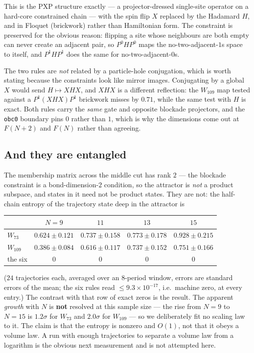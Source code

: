 \documentclass[11pt]{article}
\newcommand{\rt}[1]{\texttt{#1}}
\theoremstyle{plain}
\begin{document}
\noindent This is the PXP structure exactly --- a projector-dressed single-site
operator on a hard-core constrained chain --- with the spin flip $X$ replaced by
the Hadamard $H$, and in Floquet (brickwork) rather than Hamiltonian form. The
constraint is preserved for the obvious reason: flipping a site whose neighbours
are both empty can never create an adjacent pair, so $P^0HP^0$ maps the
no-two-adjacent-$1$s space to itself, and $P^1HP^1$ does the same for
no-two-adjacent-$0$s.

The two rules are \emph{not} related by a particle-hole conjugation, which is
worth stating because the constraints look like mirror images. Conjugating by a
global $X$ would send $H\mapsto XHX$, and $XHX$ is a different reflection: the
$W_{109}$ map tested against a $P^1(XHX)P^1$ brickwork misses by $0.71$, while
the same test with $H$ is exact. Both rules carry the \emph{same} gate and
opposite blockade projectors, and the \rt{obc0} boundary pins $0$ rather than
$1$, which is why the dimensions come out at $F(N+2)$ and $F(N)$ rather than
agreeing.

\subsection{And they are entangled}

The membership matrix across the middle cut has rank $2$ --- the blockade
constraint is a bond-dimension-$2$ condition, so the attractor is \emph{not} a
product subspace, and states in it need not be product states. They are not: the
half-chain entropy of the trajectory state deep in the attractor is

\begin{center}
\begin{tabular}{lcccc}
\toprule
 & $N=9$ & $11$ & $13$ & $15$ \\
\midrule
$W_{73}$  & $0.624\pm0.121$ & $0.737\pm0.158$ & $0.773\pm0.178$ & $0.928\pm0.215$ \\
$W_{109}$ & $0.386\pm0.084$ & $0.616\pm0.117$ & $0.737\pm0.152$ & $0.751\pm0.166$ \\
\midrule
the six & $0$ & $0$ & $0$ & $0$ \\
\bottomrule
\end{tabular}
\end{center}

\noindent ($24$ trajectories each, averaged over an $8$-period window, errors are
standard errors of the mean; the six rules read $\le 9.3\times10^{-17}$, i.e.\
machine zero, at every entry.) The contrast with that row of exact zeros is the
result. The apparent \emph{growth} with $N$ is \textbf{not} resolved at this
sample size --- the rise from $N=9$ to $N=15$ is $1.2\sigma$ for $W_{73}$ and
$2.0\sigma$ for $W_{109}$ --- so we deliberately fit no scaling law to it. The
claim is that the entropy is nonzero and $O(1)$, not that it obeys a volume law.
A run with enough trajectories to separate a volume law from a logarithm is the
obvious next measurement and is not attempted here.
\end{document}
